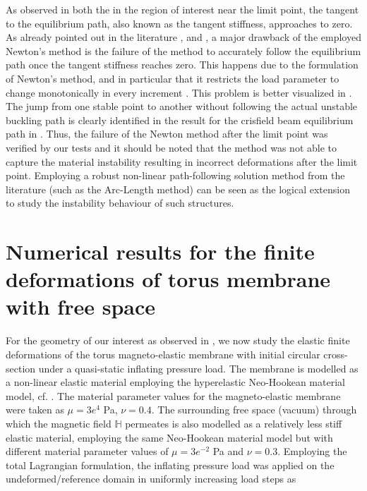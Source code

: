 As observed in both the  in the region of interest near the limit point, the tangent to the equilibrium path, also known as the tangent stiffness, approaches to zero. As already pointed out in the literature \cite{Riks1979}, \cite{CRISFIELD1981} and \cite{Vasios}, a major drawback of the employed Newton's method is the failure of the method to accurately follow the equilibrium path once the tangent stiffness reaches zero. This happens due to the formulation of Newton's method, and in particular that it restricts the load parameter to change monotonically in every increment \cite{Vasios}. This problem is better visualized in . The jump from one stable point to another without following the actual unstable buckling path is clearly identified in the result for the crisfield beam equilibrium path in . Thus, the failure of the Newton method after the limit point was verified by our tests and it should be noted that the method was not able to capture the material instability resulting in incorrect deformations after the limit point. Employing a robust non-linear path-following solution method from the literature \cite{CRISFIELD1981} (such as the Arc-Length method) can be seen as the logical extension to study the instability behaviour of such structures. \par 

\newpage
\section{Numerical results for the finite deformations of torus membrane with free space}
For the geometry of our interest as observed in , we now study the elastic finite deformations of the torus magneto-elastic membrane with initial circular cross-section under a quasi-static inflating pressure load. The membrane is modelled as a non-linear elastic material employing the hyperelastic Neo-Hookean material model, cf. . The material parameter values for the magneto-elastic membrane were taken as $\mu = 3e^4$ Pa, $\nu = 0.4$. The surrounding free space (vacuum) through which the magnetic field $\mathbb{H}$ permeates is also modelled as a relatively less stiff elastic material, employing the same Neo-Hookean material model but with different material parameter values of $\mu = 3e^{-2}$ Pa and $\nu = 0.3$. Employing the total Lagrangian formulation, the inflating pressure load was applied on the undeformed/reference domain in uniformly increasing load steps as


